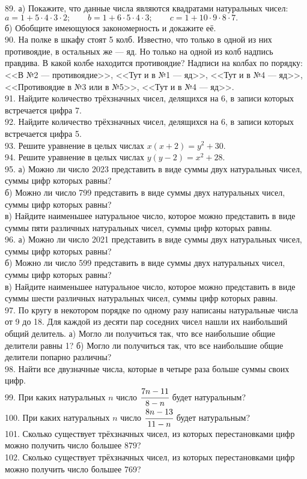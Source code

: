 89. а) Покажите, что данные числа являются квадратами натуральных чисел:\\
$a=1+5\cdot4\cdot3\cdot2;\qquad b=1+6\cdot5\cdot4\cdot3;\qquad c=1+10\cdot9\cdot8\cdot7.$\\
б) Обобщите имеющуюся закономерность и докажите её.\\
90. На полке в шкафу стоят 5 колб. Известно, что только в одной из них противоядие, в остальных же --- яд. Но только на одной из колб надпись правдива. В какой колбе находится противоядие? Надписи на колбах по порядку: <<В №2 --- противоядие>>, <<Тут и в №1 --- яд>>, <<Тут и в №4 --- яд>>, <<Противоядие в №3 или в №5>>,
<<Тут и в №4 --- яд>>.\\
91. Найдите количество трёхзначных чисел, делящихся на 6, в записи которых встречается цифра 7.\\
92. Найдите количество трёхзначных чисел, делящихся на 6, в записи которых встречается цифра 5.\\
93. Решите уравнение в целых числах $x(x+2)=y^2+30.$\\
94. Решите уравнение в целых числах $y(y-2)=x^2+28.$\\
95. а) Можно ли число 2023 представить в виде суммы двух натуральных чисел, суммы цифр которых равны?\\
б) Можно ли число 799 представить в виде суммы двух натуральных чисел, суммы цифр которых равны?\\
в) Найдите наименьшее натуральное число, которое можно представить в виде суммы пяти различных натуральных чисел, суммы цифр которых равны.\\
96. а) Можно ли число 2021 представить в виде суммы двух натуральных чисел, суммы цифр которых равны?\\
б) Можно ли число 599 представить в виде суммы двух натуральных чисел, суммы цифр которых равны?\\
в) Найдите наименьшее натуральное число, которое можно представить в виде суммы шести различных натуральных чисел, суммы цифр которых равны.\\
97. По кругу в некотором порядке по одному разу написаны натуральные числа от 9 до 18. Для каждой из десяти пар соседних чисел нашли их наибольший общий делитель. а) Могло ли получиться так, что все наибольшие общие делители равны 1? б) Могло ли получиться так, что все наибольшие общие делители попарно различны?\\
98. Найти все двузначные числа, которые в четыре раза больше суммы своих цифр.\\
99. При каких натуральных $n$ число $\cfrac{7n-11}{8-n}$ будет натуральным?\\
100. При каких натуральных $n$ число $\cfrac{8n-13}{11-n}$ будет натуральным?\\
101. Сколько существует трёхзначных чисел, из которых перестановками цифр можно получить число большее 879?\\
102. Сколько существует трёхзначных чисел, из которых перестановками цифр можно получить число большее 769?
\newpage

